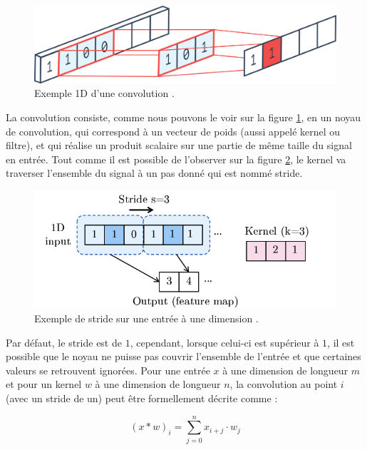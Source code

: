 \begin{figure}[hbt!]
    \centering
    \includegraphics[scale=0.3]{Figures/convolution_exemple.png}
    \caption{Exemple 1D d'une convolution \cite{noauthor_wnixdpng_nodate}.}
    \label{fig:convolution_exemple}
\end{figure}

La convolution consiste, comme nous pouvons le voir sur la figure \ref{fig:convolution_exemple}, en un noyau de convolution, qui correspond à un vecteur de poids (aussi appelé kernel ou filtre), et qui réalise un produit scalaire sur une partie de même taille du signal en entrée. Tout comme il est possible de l'observer sur la figure \ref{fig:convolution_stride_example}, le kernel va traverser l'ensemble du signal à un pas donné qui est nommé stride.

\begin{figure}[hbt!]
    \centering
    \includegraphics[scale=1.2]{Figures/convolution_stride_example.png}
    \caption{Exemple de stride sur une entrée à une dimension \cite{noauthor_figure_nodate}.}
    \label{fig:convolution_stride_example}
\end{figure}

Par défaut, le stride est de $1$, cependant, lorsque celui-ci est supérieur à $1$, il est possible que le noyau ne puisse pas couvrir l'ensemble de l'entrée et que certaines valeurs se retrouvent ignorées. Pour une entrée $x$ à une dimension de longueur $m$ et pour un kernel $w$ à une dimension de longueur $n$, la convolution au point $i$ (avec un stride de un) peut être formellement décrite comme :

\[
(x * w)_i = \sum^{n}_{j=0} x_{i+j} \cdot w_j
\]


